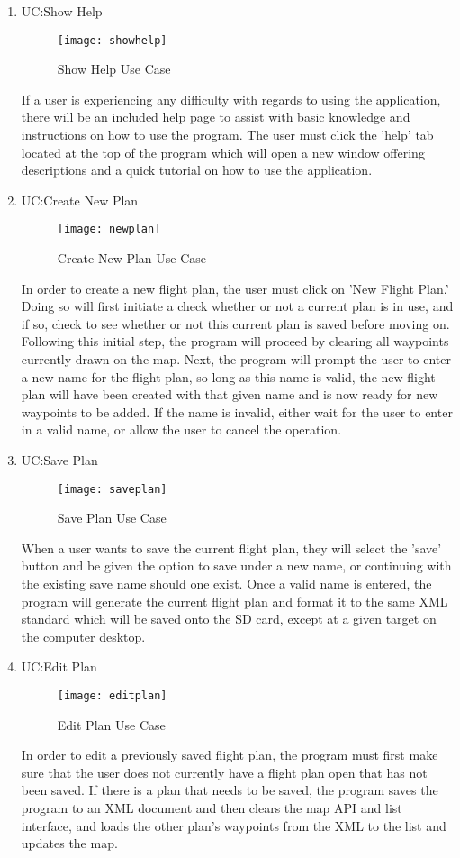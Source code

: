 \documentclass[12pt, letterpaper]{article}
\begin{document}
    \begin{enumerate}
      \item UC:Show Help
	\begin{figure}[!ht]
		\caption{Show Help Use Case}
    		\centering
    		\texttt{[image: showhelp]}
	\end{figure}
	If a user is experiencing any difficulty with regards to using the application, there will be an included help page to assist with basic knowledge and instructions on how to use the program. The 		user must click the 'help' tab located at the top of the program which will open a new window offering descriptions and a quick tutorial on how to use the application.

      \item UC:Create New Plan
	\begin{figure}[!ht]
		\caption{Create New Plan Use Case}
    		\centering
    		\texttt{[image: newplan]}
	\end{figure}
	In order to create a new flight plan, the user must click on 'New Flight Plan.' Doing so will first initiate a check whether or not a current plan is in use, and if so, check to see whether or not 		this current plan is saved before moving on. Following this initial step, the program will proceed by clearing all waypoints currently drawn on the map. Next, the program will prompt the user to 		enter a new name for the flight plan, so long as this name is valid, the new flight plan will have been created with that given name and is now ready for new waypoints to be added. If the name is 		invalid, either wait for the user to enter in a valid name, or allow the user to cancel the operation.

      \item UC:Save Plan
	\begin{figure}[!ht]
		\caption{Save Plan Use Case}
    		\centering
    		\texttt{[image: saveplan]}
	\end{figure}
	When a user wants to save the current flight plan, they will select the 'save' button and be given the option to save under a new name, or continuing with the existing save name should one exist. 		Once a valid name is entered, the program will generate the current flight plan and format it to the same XML standard which will be saved onto the SD card, except at a given target on the 		computer desktop. 

      \item UC:Edit Plan
	\begin{figure}[!ht]
		\caption{Edit Plan Use Case}
    		\centering
    		\texttt{[image: editplan]}
	\end{figure}
	In order to edit a previously saved flight plan, the program must first make sure that the user does not currently have a flight plan open that has not been saved. If there is a plan that needs to be saved, the program saves the program to an XML document and then clears the map API and list interface, and loads the other plan’s waypoints from the XML to the list and updates the map.


\end{enumerate}
\end{document}
